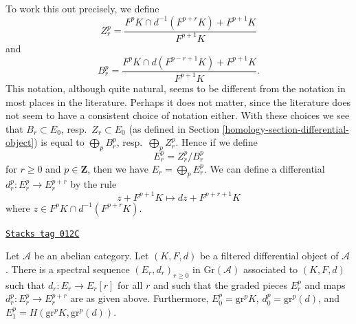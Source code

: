\medskip\noindent
To work this out precisely, we define
$$
Z_r^p =
\frac{F^pK \cap d^{-1}(F^{p + r}K) + F^{p + 1}K}{F^{p + 1}K}
$$
and
$$
B_r^p =
\frac{F^pK \cap d(F^{p - r + 1}K) + F^{p + 1}K}{F^{p + 1}K}.
$$
This notation, although quite natural, seems to be different from the
notation in most places in the literature. Perhaps it does not matter,
since the literature does not seem to have a consistent choice of notation
either. With these choices we see that $B_r \subset E_0$,
resp.\ $Z_r \subset E_0$ (as defined in
Section \ref{homology-section-differential-object}) is equal to
$\bigoplus_p B_r^p$, resp.\ $\bigoplus_p Z_r^p$.
Hence if we define
$$
E_r^p = Z_r^p/B_r^p
$$
for $r \geq 0$ and $p \in \mathbf{Z}$, then we have $E_r = \bigoplus_p E_r^p$.
We can define a differential $d_r^p : E_r^p \to E_r^{p + r}$
by the rule
$$
z + F^{p + 1}K
\longmapsto
dz + F^{p + r + 1}K
$$
where $z \in F^pK \cap d^{-1}(F^{p + r}K)$.

\begin{lemma}
\label{homology-lemma-spectral-sequence-filtered-differential}
\href{https://stacks.math.columbia.edu/tag/012C}{\texttt{Stacks tag 012C}}

Let $\mathcal{A}$ be an abelian category. Let $(K, F, d)$ be a
filtered differential object of $\mathcal{A}$. There is a
spectral sequence $(E_r, d_r)_{r \geq 0}$ in $\text{Gr}(\mathcal{A})$
associated to $(K, F, d)$ such that $d_r : E_r \to E_r[r]$
for all $r$ and such that the graded pieces
$E_r^p$ and maps $d_r^p : E_r^p \to E_r^{p + r}$
are as given above. Furthermore, $E_0^p = \text{gr}^p K$,
$d_0^p = \text{gr}^p(d)$, and $E_1^p = H(\text{gr}^pK, \text{gr}^p(d))$.
\end{lemma}

